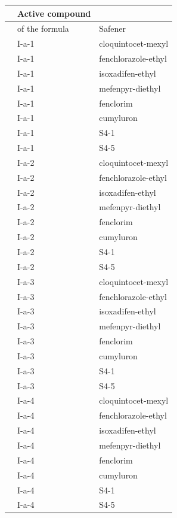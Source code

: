 \documentclass[11pt,a4paper]{article}
\begin{document}
\begin{table}[h]
\begin{tabular}{|l|l|l|}
\hline
 & Active compound &  \\ \hline
 & of the formula & Safener \\ \hline
 & I-a-1 & cloquintocet-mexyl \\ \hline
 & I-a-1 & fenchlorazole-ethyl \\ \hline
 & I-a-1 & isoxadifen-ethyl \\ \hline
 & I-a-1 & mefenpyr-diethyl \\ \hline
 & I-a-1 & fenclorim \\ \hline
 & I-a-1 & cumyluron \\ \hline
 & I-a-1 & S4-1 \\ \hline
 & I-a-1 & S4-5 \\ \hline
 & I-a-2 & cloquintocet-mexyl \\ \hline
 & I-a-2 & fenchlorazole-ethyl \\ \hline
 & I-a-2 & isoxadifen-ethyl \\ \hline
 & I-a-2 & mefenpyr-diethyl \\ \hline
 & I-a-2 & fenclorim \\ \hline
 & I-a-2 & cumyluron \\ \hline
 & I-a-2 & S4-1 \\ \hline
 & I-a-2 & S4-5 \\ \hline
 & I-a-3 & cloquintocet-mexyl \\ \hline
 & I-a-3 & fenchlorazole-ethyl \\ \hline
 & I-a-3 & isoxadifen-ethyl \\ \hline
 & I-a-3 & mefenpyr-diethyl \\ \hline
 & I-a-3 & fenclorim \\ \hline
 & I-a-3 & cumyluron \\ \hline
 & I-a-3 & S4-1 \\ \hline
 & I-a-3 & S4-5 \\ \hline
 & I-a-4 & cloquintocet-mexyl \\ \hline
 & I-a-4 & fenchlorazole-ethyl \\ \hline
 & I-a-4 & isoxadifen-ethyl \\ \hline
 & I-a-4 & mefenpyr-diethyl \\ \hline
 & I-a-4 & fenclorim \\ \hline
 & I-a-4 & cumyluron \\ \hline
 & I-a-4 & S4-1 \\ \hline
 & I-a-4 & S4-5 \\ \hline

\end{tabular}
\end{table}
\end{document}
